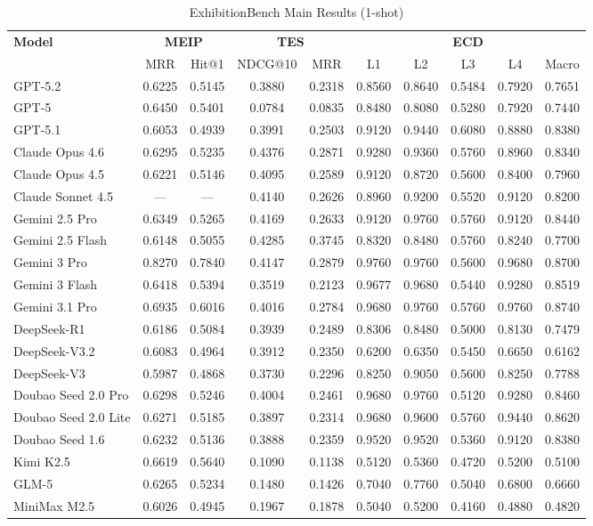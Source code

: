 \begin{table}[ht]
\centering
\caption{ExhibitionBench Main Results (1-shot)}
\label{tab:main-results-shot1}
\begin{tabular}{l|cc|cc|ccccc}
\toprule
\textbf{Model} & \multicolumn{2}{c|}{\textbf{MEIP}} & \multicolumn{2}{c|}{\textbf{TES}} & \multicolumn{5}{c}{\textbf{ECD}} \\
 & MRR & Hit@1 & NDCG@10 & MRR & L1 & L2 & L3 & L4 & Macro \\
\midrule
GPT-5.2 & 0.6225 & 0.5145 & 0.3880 & 0.2318 & 0.8560 & 0.8640 & 0.5484 & 0.7920 & 0.7651 \\
GPT-5 & 0.6450 & 0.5401 & 0.0784 & 0.0835 & 0.8480 & 0.8080 & 0.5280 & 0.7920 & 0.7440 \\
GPT-5.1 & 0.6053 & 0.4939 & 0.3991 & 0.2503 & 0.9120 & 0.9440 & 0.6080 & 0.8880 & 0.8380 \\
Claude Opus 4.6 & 0.6295 & 0.5235 & 0.4376 & 0.2871 & 0.9280 & 0.9360 & 0.5760 & 0.8960 & 0.8340 \\
Claude Opus 4.5 & 0.6221 & 0.5146 & 0.4095 & 0.2589 & 0.9120 & 0.8720 & 0.5600 & 0.8400 & 0.7960 \\
Claude Sonnet 4.5 & — & — & 0.4140 & 0.2626 & 0.8960 & 0.9200 & 0.5520 & 0.9120 & 0.8200 \\
Gemini 2.5 Pro & 0.6349 & 0.5265 & 0.4169 & 0.2633 & 0.9120 & 0.9760 & 0.5760 & 0.9120 & 0.8440 \\
Gemini 2.5 Flash & 0.6148 & 0.5055 & 0.4285 & 0.3745 & 0.8320 & 0.8480 & 0.5760 & 0.8240 & 0.7700 \\
Gemini 3 Pro & 0.8270 & 0.7840 & 0.4147 & 0.2879 & 0.9760 & 0.9760 & 0.5600 & 0.9680 & 0.8700 \\
Gemini 3 Flash & 0.6418 & 0.5394 & 0.3519 & 0.2123 & 0.9677 & 0.9680 & 0.5440 & 0.9280 & 0.8519 \\
Gemini 3.1 Pro & 0.6935 & 0.6016 & 0.4016 & 0.2784 & 0.9680 & 0.9760 & 0.5760 & 0.9760 & 0.8740 \\
DeepSeek-R1 & 0.6186 & 0.5084 & 0.3939 & 0.2489 & 0.8306 & 0.8480 & 0.5000 & 0.8130 & 0.7479 \\
DeepSeek-V3.2 & 0.6083 & 0.4964 & 0.3912 & 0.2350 & 0.6200 & 0.6350 & 0.5450 & 0.6650 & 0.6162 \\
DeepSeek-V3 & 0.5987 & 0.4868 & 0.3730 & 0.2296 & 0.8250 & 0.9050 & 0.5600 & 0.8250 & 0.7788 \\
Doubao Seed 2.0 Pro & 0.6298 & 0.5246 & 0.4004 & 0.2461 & 0.9680 & 0.9760 & 0.5120 & 0.9280 & 0.8460 \\
Doubao Seed 2.0 Lite & 0.6271 & 0.5185 & 0.3897 & 0.2314 & 0.9680 & 0.9600 & 0.5760 & 0.9440 & 0.8620 \\
Doubao Seed 1.6 & 0.6232 & 0.5136 & 0.3888 & 0.2359 & 0.9520 & 0.9520 & 0.5360 & 0.9120 & 0.8380 \\
Kimi K2.5 & 0.6619 & 0.5640 & 0.1090 & 0.1138 & 0.5120 & 0.5360 & 0.4720 & 0.5200 & 0.5100 \\
GLM-5 & 0.6265 & 0.5234 & 0.1480 & 0.1426 & 0.7040 & 0.7760 & 0.5040 & 0.6800 & 0.6660 \\
MiniMax M2.5 & 0.6026 & 0.4945 & 0.1967 & 0.1878 & 0.5040 & 0.5200 & 0.4160 & 0.4880 & 0.4820 \\
\bottomrule
\end{tabular}
\end{table}